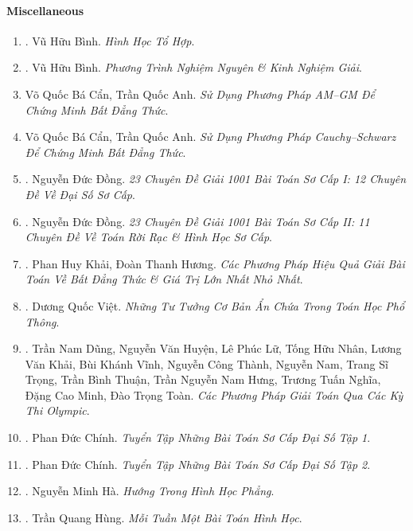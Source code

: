 \documentclass{article}
\begin{document}
\paragraph{Miscellaneous}

\begin{enumerate}
	\item \cite{Binh_HHTH}. Vũ Hữu Bình. {\it Hình Học Tổ Hợp}.\hfill{\sf[reading]}
	\item \cite{Binh_PTNN}. Vũ Hữu Bình. {\it Phương Trình Nghiệm Nguyên \& Kinh Nghiệm Giải}.\hfill{\sf[reading]}
	\item Võ Quốc Bá Cẩn, Trần Quốc Anh. {\it Sử Dụng Phương Pháp AM--GM Để Chứng Minh Bất Đẳng Thức}.
	\item Võ Quốc Bá Cẩn, Trần Quốc Anh. {\it Sử Dụng Phương Pháp Cauchy--Schwarz Để Chứng Minh Bất Đẳng Thức}.
	\item \cite{Dong_23_1001_toan_I}. Nguyễn Đức Đồng. {\it 23 Chuyên Đề Giải 1001 Bài Toán Sơ Cấp I: 12 Chuyên Đề Về Đại Số Sơ Cấp}.\hfill{\sf[reading]}
	\item \cite{Dong_23_1001_toan_II}. Nguyễn Đức Đồng. {\it 23 Chuyên Đề Giải 1001 Bài Toán Sơ Cấp II: 11 Chuyên Đề Về Toán Rời Rạc \& Hình Học Sơ Cấp}.\hfill{\sf[reading]}
	\item \cite{Khai_Huong_bdt}. Phan Huy Khải, Đoàn Thanh Hương. {\it Các Phương Pháp Hiệu Quả Giải Bài Toán Về Bất Đẳng Thức \& Giá Trị Lớn Nhất Nhỏ Nhất}.\hfill{\sf[reading]}
	\item \cite{Viet2014}. Dương Quốc Việt. {\it Những Tư Tưởng Cơ Bản Ẩn Chứa Trong Toán Học Phổ Thông}.\hfill{\sf[done]}
	\item \cite{Dung_cac_phuong_phap_giai_toan_qua_cac_ky_thi_olympic_2022}. Trần Nam Dũng, Nguyễn Văn Huyện, Lê Phúc Lữ, Tống Hữu Nhân, Lương Văn Khải, Bùi Khánh Vĩnh, Nguyễn Công Thành, Nguyễn Nam, Trang Sĩ Trọng, Trần Bình Thuận, Trần Nguyễn Nam Hưng, Trương Tuấn Nghĩa, Đặng Cao Minh, Đào Trọng Toàn. {\it Các Phương Pháp Giải Toán Qua Các Kỳ Thi Olympic}.\hfill{\sf[reading]}
	\item \cite{Chinh2021_tap_1}. Phan Đức Chính. {\it Tuyển Tập Những Bài Toán Sơ Cấp Đại Số Tập 1}.\hfill{\sf[reading]}
	\item \cite{Chinh2021_tap_2}. Phan Đức Chính. {\it Tuyển Tập Những Bài Toán Sơ Cấp Đại Số Tập 2}.\hfill{\sf[reading]}
	\item \cite{Ha_huong}. {\sc Nguyễn Minh Hà}. {\it Hướng Trong Hình Học Phẳng}.\hfill{\sf[done]}
	\item \cite{Hung_weekly_geometry}. {\sc Trần Quang Hùng}. {\it Mỗi Tuần Một Bài Toán Hình Học}.\hfill{\sf[reading]}

\end{enumerate}
\end{document}
